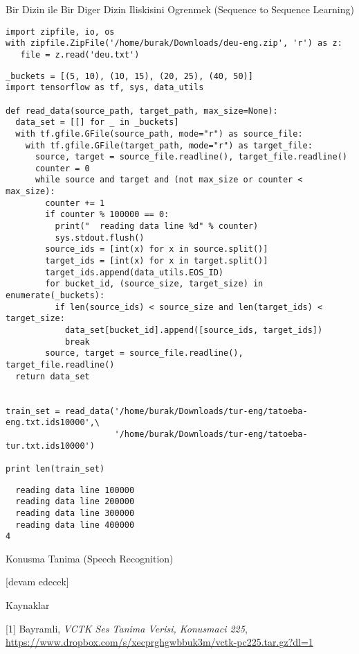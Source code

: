 \documentclass[12pt,fleqn]{article}\usepackage{../../common}
\begin{document}
Bir Dizin ile Bir Diger Dizin Iliskisini Ogrenmek (Sequence to Sequence Learning)

\begin{verbatim}
import zipfile, io, os
with zipfile.ZipFile('/home/burak/Downloads/deu-eng.zip', 'r') as z:
   file = z.read('deu.txt')
\end{verbatim}

\begin{verbatim}
_buckets = [(5, 10), (10, 15), (20, 25), (40, 50)]
import tensorflow as tf, sys, data_utils

def read_data(source_path, target_path, max_size=None):
  data_set = [[] for _ in _buckets]
  with tf.gfile.GFile(source_path, mode="r") as source_file:
    with tf.gfile.GFile(target_path, mode="r") as target_file:
      source, target = source_file.readline(), target_file.readline()
      counter = 0
      while source and target and (not max_size or counter < max_size):
        counter += 1
        if counter % 100000 == 0:
          print("  reading data line %d" % counter)
          sys.stdout.flush()
        source_ids = [int(x) for x in source.split()]
        target_ids = [int(x) for x in target.split()]
        target_ids.append(data_utils.EOS_ID)
        for bucket_id, (source_size, target_size) in enumerate(_buckets):
          if len(source_ids) < source_size and len(target_ids) < target_size:
            data_set[bucket_id].append([source_ids, target_ids])
            break
        source, target = source_file.readline(), target_file.readline()
  return data_set


train_set = read_data('/home/burak/Downloads/tur-eng/tatoeba-eng.txt.ids10000',\
                      '/home/burak/Downloads/tur-eng/tatoeba-tur.txt.ids10000')

print len(train_set)
\end{verbatim}

\begin{verbatim}
  reading data line 100000
  reading data line 200000
  reading data line 300000
  reading data line 400000
4
\end{verbatim}


















Konusma Tanima (Speech Recognition)












[devam edecek]

Kaynaklar

[1] Bayramli, {\em VCTK Ses Tanima Verisi, Konusmaci 225}, \url{https://www.dropbox.com/s/xecprghgwbbuk3m/vctk-pc225.tar.gz?dl=1}
\end{document}
